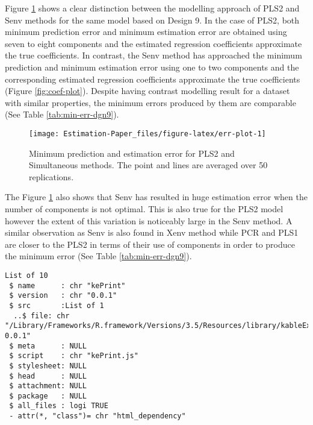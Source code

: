 \documentclass[12pt,3p,authoryear]{elsarticle}
\begin{document}
Figure \ref{fig:err-plot} shows a clear distinction between the modelling approach of PLS2 and Senv methods for the same model based on Design 9. In the case of PLS2, both minimum prediction error and minimum estimation error are obtained using seven to eight components and the estimated regression coefficients approximate the true coefficients. In contrast, the Senv method has approached the minimum prediction and minimum estimation error using one to two components and the corresponding estimated regression coefficients approximate the true coefficients (Figure \ref{fig:coef-plot}). Despite having contrast modelling result for a dataset with similar properties, the minimum errors produced by them are comparable (See Table \ref{tab:min-err-dgn9}).

\begin{figure}
\texttt{[image: Estimation-Paper\_files/figure-latex/err-plot-1]} \caption{Minimum prediction and estimation error for PLS2 and Simultaneous methods. The point and lines are averaged over 50 replications.}\label{fig:err-plot}
\end{figure}

The Figure \ref{fig:err-plot} also shows that Senv has resulted in huge estimation error when the number of components is not optimal. This is also true for the PLS2 model however the extent of this variation is noticeably large in the Senv method. A similar observation as Senv is also found in Xenv method while PCR and PLS1 are closer to the PLS2 in terms of their use of components in order to produce the minimum error (See Table \ref{tab:min-err-dgn9}).

\begin{verbatim}
List of 10
 $ name      : chr "kePrint"
 $ version   : chr "0.0.1"
 $ src       :List of 1
  ..$ file: chr "/Library/Frameworks/R.framework/Versions/3.5/Resources/library/kableExtra/kePrint-0.0.1"
 $ meta      : NULL
 $ script    : chr "kePrint.js"
 $ stylesheet: NULL
 $ head      : NULL
 $ attachment: NULL
 $ package   : NULL
 $ all_files : logi TRUE
 - attr(*, "class")= chr "html_dependency"
\end{verbatim}
\end{document}
